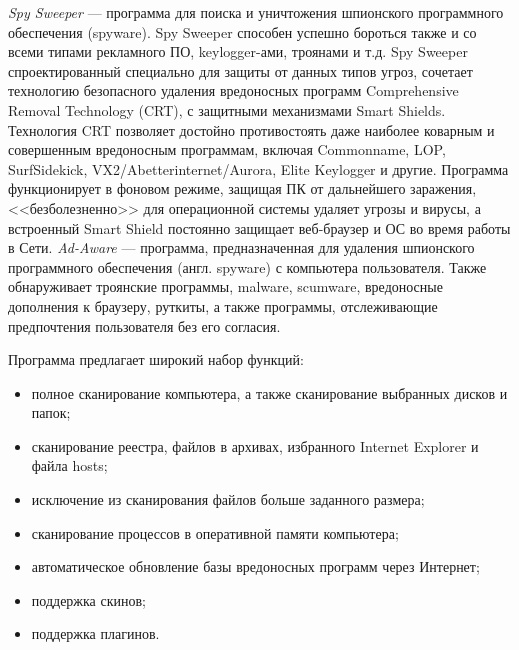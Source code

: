 \textit{Spy Sweeper} --- программа для поиска и уничтожения шпионского
программного обеспечения (spyware). Spy Sweeper способен успешно бороться также
и со всеми типами рекламного ПО, keylogger-ами, троянами и т.д.
Spy Sweeper спроектированный специально для защиты от данных типов угроз,
сочетает технологию безопасного удаления вредоносных программ
Comprehensive Removal Technology (CRT), с защитными механизмами Smart Shields.
Технология CRT позволяет достойно противостоять даже наиболее коварным и совершенным
вредоносным программам, включая Commonname, LOP, SurfSidekick,
VX2/Abetterinternet/Aurora, Elite Keylogger и другие.
Программа функционирует в фоновом режиме, защищая ПК от дальнейшего заражения,
<<безболезненно>> для операционной системы удаляет угрозы и вирусы,
а встроенный Smart Shield постоянно защищает веб-браузер и ОС во время работы в Сети.
\textit{Ad-Aware} --- программа, предназначенная для удаления шпионского
программного обеспечения (англ. spyware) с компьютера пользователя.
Также обнаруживает троянские программы, malware, scumware, вредоносные
дополнения к браузеру, руткиты, а также программы,
отслеживающие предпочтения пользователя без его согласия.

Программа предлагает широкий набор функций:
\begin{itemize}
\item полное сканирование компьютера, а также сканирование выбранных дисков и папок;
\item сканирование реестра, файлов в архивах, избранного Internet Explorer и файла hosts;
\item исключение из сканирования файлов больше заданного размера;
\item сканирование процессов в оперативной памяти компьютера;
\item автоматическое обновление базы вредоносных программ через Интернет;
\item поддержка скинов;
\item поддержка плагинов.
\end{itemize}
